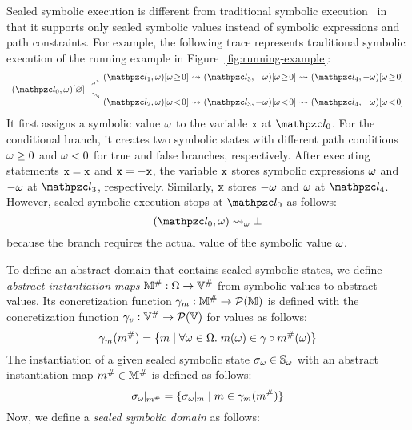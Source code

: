 Sealed symbolic execution is different from traditional
symbolic execution~\cite{symbolic} in that it supports only sealed symbolic
values instead of symbolic expressions and path constraints.  For example, the
following trace represents traditional symbolic execution of the running
example in Figure~\ref{fig:running-example}:
{
\small
\[
  \begin{array}{r@{~}c@{~}c@{~}c@{~}r@{~}c@{~}r}
    &&(\lab_1, \symb)[\symb \!\geq\! 0]
    &\trans& (\lab_3, \phantom{-}\symb)[\symb \!\geq\! 0]
    &\trans& (\lab_4, -\symb)[\symb \!\geq\! 0]
    \vspace*{-0.5em}\\
    &\rutrans&
    \vspace*{-0.5em}\\
    (\lab_0, \symb)[\varnothing]
    \vspace*{-0.5em}\\
    &\rdtrans&
    \vspace*{-0.5em}\\
    &&(\lab_2, \symb)[\symb \!<\! 0]
    &\trans& (\lab_3, -\symb)[\symb \!<\! 0]
    &\trans& (\lab_4, \phantom{-}\symb)[\symb \!<\! 0]\\
  \end{array}
\]
}
It first assigns a symbolic value $\omega$ to the variable $\texttt{x}$ at $\lab_0$.
For the conditional branch, it creates two symbolic states with
different path conditions $\omega \geq 0$ and $\omega < 0$ for true and false
branches, respectively.  After executing statements $\texttt{x} = \texttt{x}$ and $\texttt{x} =
-\texttt{x}$, the variable $\texttt{x}$ stores symbolic expressions $\omega$ and $-\omega$
at $\lab_3$, respectively. Similarly, $\texttt{x}$  stores $-\omega$ and $\omega$ at $\lab_4$.
However, sealed symbolic execution stops at $\lab_0$ as follows:
\[
  (\lab_0, \symb) \; \symbtrans \; \excst
\]
because the branch requires the actual value of the symbolic value $\omega$.

To define an abstract domain that contains sealed symbolic states, we define
\textit{abstract instantiation maps} ${\mathbb{M}}^{\#}: \Omega \rightarrow
{\mathbb{V}}^{\#}$ from symbolic values to abstract values.  Its concretization
function $\gamma_m: {\mathbb{M}}^{\#} \rightarrow \mathcal{P}(\mathbb{M})$ is defined
with the concretization function $\gamma_v: {\mathbb{V}}^{\#} \rightarrow
\mathcal{P}(\mathbb{V})$ for values as follows:
\[
  \gamma_m({m}^{\#}) = \{
    m \mid \forall \omega \in \Omega. \;
    m(\omega) \in \gamma \circ {m}^{\#}(\omega)
  \}
\]
The instantiation of a given sealed symbolic state ${\sigma}_\omega \in {\mathbb{S}}_\omega$ with
an abstract instantiation map ${m}^{\#} \in {\mathbb{M}}^{\#}$ is defined as follows:
\[
  \instant{\symbst}{\absimap} = \{ \instant{\symbst}{\imap} \mid \imap \in
  \imapgamma(\absimap) \}
\]
Now, we define a \textit{sealed symbolic domain} as follows:

